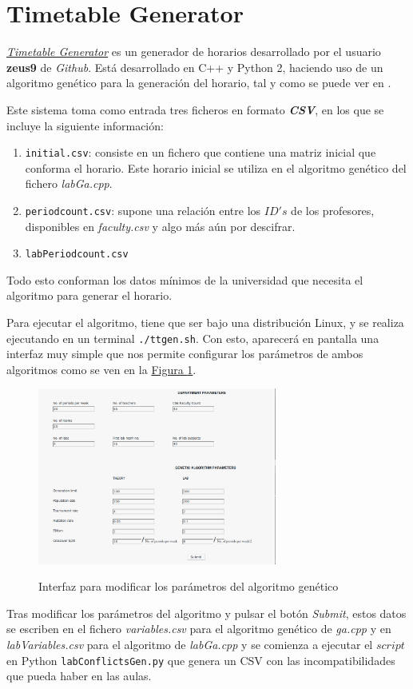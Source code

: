 \section{Timetable Generator}

\href{https://github.com/zeus9/timetable_generator}{\textit{Timetable Generator}} es un generador de horarios desarrollado por el usuario \textbf{zeus9} de \textit{Github}. Está desarrollado en C++ y Python 2, haciendo uso de un algoritmo genético para la generación del horario, tal y como se puede ver en \cite{timetableGenerator}.

Este sistema toma como entrada tres ficheros en formato \textbf{\textit{CSV}}, en los que se incluye la siguiente información:

\begin{enumerate}[$\bullet$]
    \item \texttt{initial.csv}: consiste en un fichero que contiene una matriz inicial que conforma el horario. Este horario inicial se utiliza en el algoritmo genético del fichero \textit{labGa.cpp}.
    \item \texttt{periodcount.csv}: supone una relación entre los $ID's$ de los profesores, disponibles en \textit{faculty.csv} y algo más aún por descifrar.
    \item \texttt{labPeriodcount.csv}
\end{enumerate}

Todo esto conforman los datos mínimos de la universidad que necesita el algoritmo para generar el horario. 

Para ejecutar el algoritmo, tiene que ser bajo una distribución Linux, y se realiza ejecutando en un terminal \texttt{./ttgen.sh}. Con esto, aparecerá en pantalla una interfaz muy simple que nos permite configurar los parámetros de ambos algoritmos como se ven en la \hyperref[ttgen1]{Figura \ref{ttgen1}}.

\begin{figure}[H]
    \centering
    \includegraphics[width=0.7\textwidth]{ttgen1}
    \label{ttgen1}
    \caption{Interfaz para modificar los parámetros del algoritmo genético}
\end{figure}

Tras modificar los parámetros del algoritmo y pulsar el botón \textit{Submit}, estos datos se escriben en el fichero \textit{variables.csv} para el algoritmo genético de \textit{ga.cpp} y en \textit{labVariables.csv} para el algoritmo de \textit{labGa.cpp} y se comienza a ejecutar el $script$ en Python \texttt{labConflictsGen.py} que genera un CSV con las incompatibilidades que pueda haber en las aulas.
